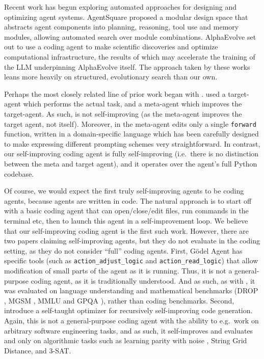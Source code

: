 Recent work has begun exploring automated approaches for designing and
optimizing agent systems. AgentSquare \citep{shangAgentSquareAutomaticLLM2024}
proposed a modular design space that abstracts agent components into planning,
reasoning, tool use and memory modules, allowing automated search over module
combinations.
AlphaEvolve \citep{novikovAlphaEvolveCodingAgent2025} set out to use a coding agent to
make scientific discoveries and optimize computational infrastructure, the
results of which may accelerate the training of the LLM underpinning
AlphaEvolve itself. The approach taken by these works leans more heavily on
structured, evolutionary search than our own.

Perhaps the most closely related line of prior work began with
 \citep{huAutomatedDesignAgentic2024}.
 used a target-agent which performs the actual task, and a meta-agent which improves the target-agent.
As such,  is not self-improving (as the meta-agent improves the target agent, not itself).
Moreover, in  the meta-agent edits only a single \texttt{forward} function, written in a domain-specific language which has been carefully designed to make expressing different prompting schemes very straightforward.
In contrast, our self-improving coding agent is fully self-improving (i.e.\
there is no distinction between the meta and target agent), and it operates over
the agent's full Python codebase.

Of course, we would expect the first truly self-improving agents to be coding agents, because agents are written in code.
The natural approach is to start off with a basic coding agent that can open/close/edit files, run commands in the terminal etc, then to launch this agent in a self-improvement loop.
We believe that our self-improving coding agent is the first such work.
However, there are two papers claiming self-improving agents, but they do not evaluate in the coding setting, as they do not consider ``full'' coding agents.
First, Gödel Agent
\citep{yinGodelAgentSelfReferential2024a} has specific tools (such as \verb|action_adjust_logic| and \verb|action_read_logic|) that allow modification of small parts of the agent as it is running.
Thus, it is not a general-purpose coding agent, as it is traditionally understood.
And as such, as with \acr{ADAS}, it was evaluated on language understanding and mathematical benchmarks (DROP \citep{dua2019drop}, MGSM \citep{shi2022language}, MMLU \citep{hendrycks2020measuring} and GPQA \citep{reinGPQAGraduateLevelGoogleProof2023}), rather than coding benchmarks.
Second,
\citet{zelikmanSelfTaughtOptimizerSTOP2024} introduce a self-taught optimizer
for recursively self-improving code generation.
Again, this is not a general-purpose coding agent with the ability to e.g.\ work on arbitrary software engineering tasks, and as such, it self-improves and evaluates and only on algorithmic tasks such as learning parity with noise \citep{blum2003noise},
String Grid Distance, and 3-SAT.
